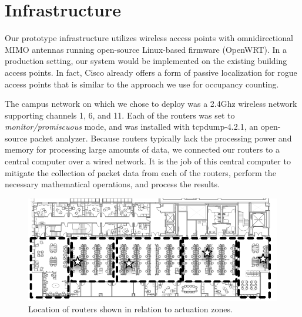 \section{Infrastructure}
Our prototype infrastructure utilizes wireless access points with omnidirectional MIMO antennas running open-source Linux-based firmware (OpenWRT). In a production setting, our system would be implemented on the existing building access points. In fact, Cisco already offers a form of passive localization for rogue access points that is similar to the approach we use for occupancy counting.

The campus network on which we chose to deploy was a 2.4Ghz wireless network supporting channels 1, 6, and 11. Each of the routers was set to \emph{monitor/promiscuous} mode, and was installed with tcpdump-4.2.1, an open-source packet analyzer. Because routers typically lack the processing power and memory for processing large amounts of data, we connected our routers to a central computer over a wired network. It is the job of this central computer to mitigate the collection of packet data from each of the routers, perform the necessary mathematical operations, and process the results. 

\begin{figure}[htb]
\begin{center}
\includegraphics[width=.75\linewidth]{figs/floormap}
\end{center}
\caption{Location of routers shown in relation to actuation zones.}
\end{figure}

